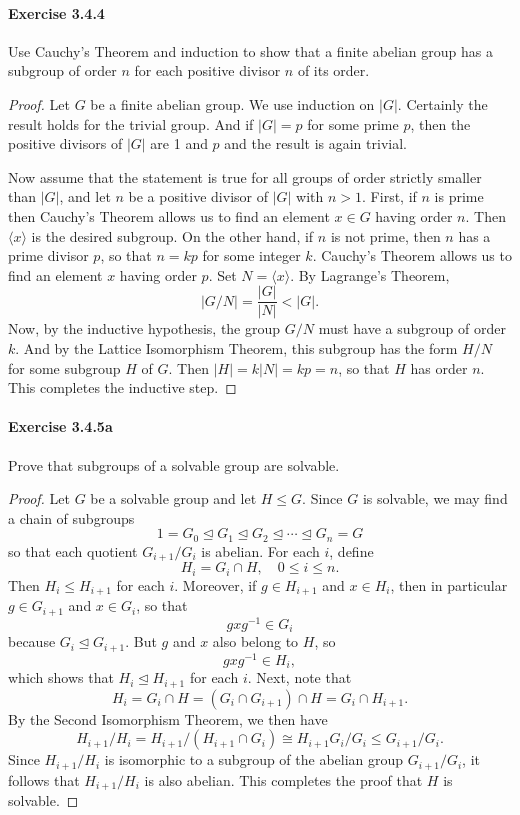 \documentclass{article}
\theoremstyle{definition}
\begin{document}
\paragraph{Exercise 3.4.4} Use Cauchy's Theorem and induction to show that a finite abelian group has a subgroup of order $n$ for each positive divisor $n$ of its order.
\begin{proof}
    Let $G$ be a finite abelian group. We use induction on $|G|$. Certainly the result holds for the trivial group. And if $|G|=p$ for some prime $p$, then the positive divisors of $|G|$ are 1 and $p$ and the result is again trivial.

Now assume that the statement is true for all groups of order strictly smaller than $|G|$, and let $n$ be a positive divisor of $|G|$ with $n>1$. First, if $n$ is prime then Cauchy's Theorem allows us to find an element $x \in G$ having order $n$. Then $\langle x\rangle$ is the desired subgroup. On the other hand, if $n$ is not prime, then $n$ has a prime divisor $p$, so that $n=k p$ for some integer $k$. Cauchy's Theorem allows us to find an element $x$ having order $p$. Set $N=\langle x\rangle$. By Lagrange's Theorem,
$$
|G / N|=\frac{|G|}{|N|}<|G| .
$$
Now, by the inductive hypothesis, the group $G / N$ must have a subgroup of order $k$. And by the Lattice Isomorphism Theorem, this subgroup has the form $H / N$ for some subgroup $H$ of $G$. Then $|H|=k|N|=k p=n$, so that $H$ has order $n$. This completes the inductive step.
\end{proof}



\paragraph{Exercise 3.4.5a} Prove that subgroups of a solvable group are solvable.
\begin{proof}
    Let $G$ be a solvable group and let $H \leq G$. Since $G$ is solvable, we may find a chain of subgroups
$$
1=G_0 \unlhd G_1 \unlhd G_2 \unlhd \cdots \unlhd G_n=G
$$
so that each quotient $G_{i+1} / G_i$ is abelian. For each $i$, define
$$
H_i=G_i \cap H, \quad 0 \leq i \leq n .
$$
Then $H_i \leq H_{i+1}$ for each $i$. Moreover, if $g \in H_{i+1}$ and $x \in H_i$, then in particular $g \in G_{i+1}$ and $x \in G_i$, so that
$$
g x g^{-1} \in G_i
$$
because $G_i \unlhd G_{i+1}$. But $g$ and $x$ also belong to $H$, so
$$
g x g^{-1} \in H_i,
$$
which shows that $H_i \unlhd H_{i+1}$ for each $i$.
Next, note that
$$
H_i=G_i \cap H=\left(G_i \cap G_{i+1}\right) \cap H=G_i \cap H_{i+1} .
$$
By the Second Isomorphism Theorem, we then have
$$
H_{i+1} / H_i=H_{i+1} /\left(H_{i+1} \cap G_i\right) \cong H_{i+1} G_i / G_i \leq G_{i+1} / G_i .
$$
Since $H_{i+1} / H_i$ is isomorphic to a subgroup of the abelian group $G_{i+1} / G_i$, it follows that $H_{i+1} / H_i$ is also abelian. This completes the proof that $H$ is solvable.
\end{proof}
\end{document}
